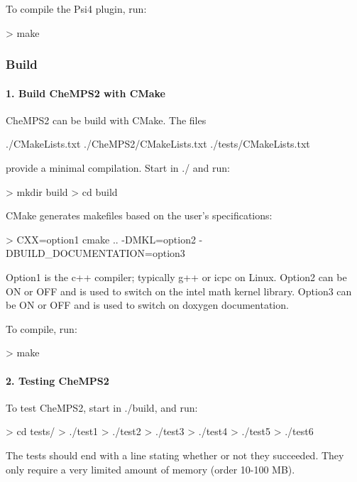 To compile the Psi4 plugin, run\-: \begin{DoxyVerb}> make
\end{DoxyVerb}


\subsubsection*{Build}

\paragraph*{1. Build Che\-M\-P\-S2 with C\-Make}

Che\-M\-P\-S2 can be build with C\-Make. The files \begin{DoxyVerb}./CMakeLists.txt
./CheMPS2/CMakeLists.txt
./tests/CMakeLists.txt
\end{DoxyVerb}


provide a minimal compilation. Start in {\ttfamily ./} and run\-: \begin{DoxyVerb}> mkdir build
> cd build
\end{DoxyVerb}


C\-Make generates makefiles based on the user's specifications\-: \begin{DoxyVerb}> CXX=option1 cmake .. -DMKL=option2 -DBUILD_DOCUMENTATION=option3
\end{DoxyVerb}


Option1 is the c++ compiler; typically {\ttfamily g++} or {\ttfamily icpc} on Linux. Option2 can be {\ttfamily O\-N} or {\ttfamily O\-F\-F} and is used to switch on the intel math kernel library. Option3 can be {\ttfamily O\-N} or {\ttfamily O\-F\-F} and is used to switch on doxygen documentation.

To compile, run\-: \begin{DoxyVerb}> make
\end{DoxyVerb}


\paragraph*{2. Testing Che\-M\-P\-S2}

To test Che\-M\-P\-S2, start in {\ttfamily ./build}, and run\-: \begin{DoxyVerb}> cd tests/
> ./test1
> ./test2
> ./test3
> ./test4
> ./test5
> ./test6
\end{DoxyVerb}


The tests should end with a line stating whether or not they succeeded. They only require a very limited amount of memory (order 10-\/100 M\-B).

